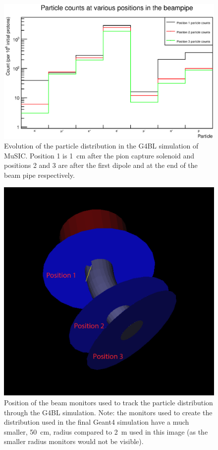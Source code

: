 \begin{figure}[hptb]
  \centering
    \includegraphics[width=.9\textwidth]{images/pid_counts_in_beamline.eps}
  \caption{Evolution of the particle distribution in the G4BL simulation of MuSIC. Position 1 is 1~cm after the pion capture solenoid and positions 2 and 3 are after the first dipole and at the end of the beam pipe respectively.}
  \label{fig:images_pid_counts_in_beamline}
\end{figure}

\begin{figure}[hptb]
  \centering
    \includegraphics[width=.9\textwidth]{images/g4bl_monitor_locations_bigger_edit.png}
  \caption{Position of the beam monitors used to track the particle distribution through the G4BL simulation. Note: the monitors used to create the distribution used in the final Geant4 simulation have a much smaller, 50~cm, radius compared to 2~m used in this image (as the smaller radius monitors would not be visible).}
  \label{fig:images_g4bl_monitor_locations_bigger_edit}
\end{figure}
\clearpage
